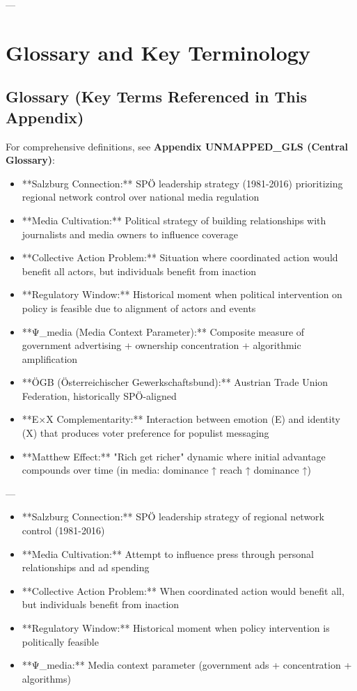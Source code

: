 {---


\section*{Glossary and Key Terminology}

\subsection*{Glossary (Key Terms Referenced in This Appendix)}

For comprehensive definitions, see \textbf{Appendix UNMAPPED_GLS (Central Glossary)}:

\begin{itemize}[nosep]
\item **Salzburg Connection:** SPÖ leadership strategy (1981-2016) prioritizing regional network control over national media regulation
\item **Media Cultivation:** Political strategy of building relationships with journalists and media owners to influence coverage
\item **Collective Action Problem:** Situation where coordinated action would benefit all actors, but individuals benefit from inaction
\item **Regulatory Window:** Historical moment when political intervention on policy is feasible due to alignment of actors and events
\item **Ψ_media (Media Context Parameter):** Composite measure of government advertising + ownership concentration + algorithmic amplification
\item **ÖGB (Österreichischer Gewerkschaftsbund):** Austrian Trade Union Federation, historically SPÖ-aligned
\item **E×X Complementarity:** Interaction between emotion (E) and identity (X) that produces voter preference for populist messaging
\item **Matthew Effect:** "Rich get richer" dynamic where initial advantage compounds over time (in media: dominance ↑ reach ↑ dominance ↑)
\end{itemize}

---

\begin{itemize}[nosep]
\item **Salzburg Connection:** SPÖ leadership strategy of regional network control (1981-2016)
\item **Media Cultivation:** Attempt to influence press through personal relationships and ad spending
\item **Collective Action Problem:** When coordinated action would benefit all, but individuals benefit from inaction
\item **Regulatory Window:** Historical moment when policy intervention is politically feasible
\item **Ψ_media:** Media context parameter (government ads + concentration + algorithms)
\end{itemize}

}
